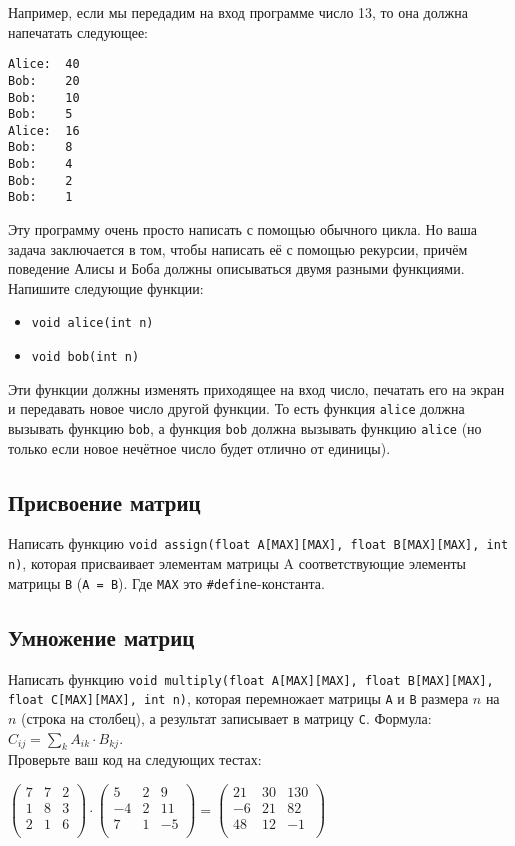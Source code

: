 \documentclass{article}
\begin{document}
Например, если мы передадим на вход программе число 13, то она должна напечатать следующее:

\begin{verbatim}
Alice:  40
Bob:    20
Bob:    10
Bob:    5
Alice:  16
Bob:    8
Bob:    4
Bob:    2
Bob:    1
\end{verbatim}

Эту программу очень просто написать с помощью обычного цикла. Но ваша задача заключается в том, чтобы написать её с помощью рекурсии, причём поведение Алисы и Боба должны описываться двумя разными функциями. Напишите следующие функции:

\begin{itemize}
\item \texttt{void alice(int n)}
\item \texttt{void bob(int n)}
\end{itemize}

Эти функции должны изменять приходящее на вход число, печатать его на экран и передавать новое число другой функции. То есть функция \texttt{alice} должна вызывать функцию \texttt{bob}, а функция \texttt{bob} должна вызывать функцию \texttt{alice} (но только если новое нечётное число будет отлично от единицы).


\subsection{Присвоение матриц}
Написать функцию \texttt{void assign(float A[MAX][MAX], float B[MAX][MAX], int n)}, которая присваивает элементам матрицы A соответствующие элементы матрицы \texttt{B} (\texttt{A = B}). Где \texttt{MAX} это \texttt{\#define}-константа.


\subsection{Умножение матриц}
Написать функцию \texttt{void multiply(float A[MAX][MAX], float B[MAX][MAX], float C[MAX][MAX], int n)}, которая перемножает матрицы \texttt{A} и \texttt{B} размера $n$ на $n$ (строка на столбец), а результат записывает в матрицу \texttt{C}. Формула: $C_{ij} = \sum\limits_k A_{ik} \cdot B_{kj}$. \\
Проверьте ваш код на следующих тестах:

\begin{center}
$\begin{pmatrix}
7 & 7 & 2 \\
1 & 8 & 3 \\
2 & 1 & 6 \\
\end{pmatrix} \cdot 
\begin{pmatrix}
5 & 2 & 9 \\
-4 & 2 & 11 \\
7 & 1 & -5 \\
\end{pmatrix}=
\begin{pmatrix}
21 & 30 & 130 \\
-6 & 21 & 82 \\
48 & 12 & -1 \\
\end{pmatrix}
$
\end{center}
\end{document}
